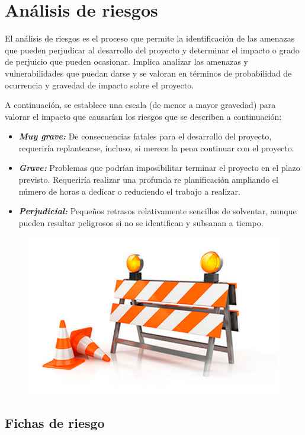 \chapter{Análisis de riesgos}
\setlength{\parindent}{2em}
El análisis de riesgos es el proceso que permite la identificación de las amenazas que pueden perjudicar al desarrollo del proyecto y determinar el impacto o grado de perjuicio que pueden ocasionar. Implica analizar las amenazas y vulnerabilidades que puedan darse y se valoran en términos de probabilidad de ocurrencia y gravedad de impacto sobre el proyecto.

\hspace*{2em}A continuación, se establece una escala (de menor a mayor gravedad) para valorar el impacto que causarían los riesgos que se describen a continuación:
	\begin{itemize}
		\item \emph{\textbf{Muy grave:}} De consecuencias fatales para el desarrollo del proyecto, requeriría replantearse, incluso, si merece la pena continuar con el proyecto.
		\item \emph{\textbf{Grave:}} Problemas que podrían imposibilitar terminar el proyecto en el plazo previsto. Requeriría realizar una profunda re planificación ampliando el número de horas a dedicar o reduciendo el trabajo a realizar.
		\item \emph{\textbf{Perjudicial:}} Pequeños retrasos relativamente sencillos de solventar, aunque pueden resultar peligrosos si no se identifican y subsanan a tiempo.
	\end{itemize}


\begin{figure}[H]
	\centering
	\includegraphics[width=0.6\linewidth]{figuras/riesgo}
	\label{fig:riesgo}
\end{figure}

\section{Fichas de riesgo}

